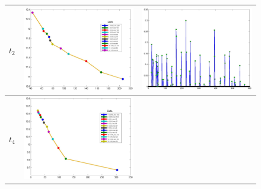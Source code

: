 \documentclass[11pt]{article}
\begin{document}
\begin{figure}[!h]
\begin{center}
\begin{tabular}{|c|c|c|}
			\hline
			$t_2$
			&	
			\includegraphics[width=.8\iwidth]{figures/newFigs/exp3paretoWeights}
			&
			\includegraphics[width=.8\iwidth]{figures/newFigs/exp3Weights}\\
			\hline
			$t_4$
			&	
			\includegraphics[width=.8\iwidth]{figures/newFigs/exp5paretoWeights}

\end{tabular}
\end{center}
\end{figure}
\end{document}
